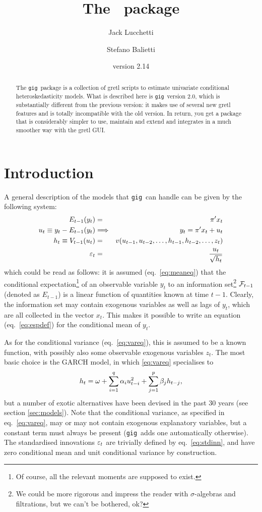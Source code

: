 \documentclass[a4paper,11pt]{article}
\title{The \gig\ package}
\author{Jack Lucchetti \and Stefano Balietti}
\date{version 2.14}
\newcommand{\app}[1]{\textsf{#1}}
\newcounter{script}[section]
\newcommand{\stdu}{\ensuremath \varepsilon}
\newcommand{\uhat}{\ensuremath u}
\newcommand{\InfSet}[1]{\ensuremath \mathcal{F}_{#1}}
\newcommand{\gig}{\texttt{gig}}
\begin{document}
\maketitle

\begin{abstract}
The \gig\ package is a collection of \app{gretl} scripts to estimate
univariate conditional heteroskedasticity models. What is described
here is \gig\ version 2.0, which is substantially different from the
previous version: it makes use of several new \app{gretl} features and
is totally incompatible with the old version. In return, you get a
package that is considerably simpler to use, maintain and extend and
integrates in a much smoother way with the \app{gretl} GUI.
\end{abstract}

\tableofcontents

\section{Introduction}

A general description of the models that \gig\ can handle can be given
by the following system:
\begin{eqnarray}
  \label{eq:meaneq}
  E_{t-1}(y_t) & = & \pi'x_t \\
  \label{eq:espdef}
  \uhat_{t} \equiv y_t - E_{t-1}(y_t) & \Longrightarrow &
  y_t = \pi'x_t + \uhat_{t} \\
  \label{eq:vareq}
  h_t \equiv V_{t-1}(\uhat_{t}) & = & 
  v(\uhat_{t-1}, \uhat_{t-2}, \ldots, 
  h_{t-1}, h_{t-2}, \ldots, z_t) \\
  \label{eq:stdinn}
  \stdu_t & = & \frac{\uhat_{t}}{\sqrt{h_t}}
\end{eqnarray}
which could be read as follows: it is assumed (eq.~\ref{eq:meaneq})
that the conditional expectation\footnote{Of course, all the relevant
  moments are supposed to exist.} of an observable variable $y_t$ to an
information set\footnote{We could be more rigorous and impress the
  reader with $\sigma$-algebras and filtrations, but we can't be
  bothered, ok?}  $\InfSet{t-1}$ (denoted as $E_{t-1}$) is a linear
function of quantities known at time $t-1$. Clearly, the information
set may contain exogenous variables as well as lags of $y_t$, which
are all collected in the vector $x_t$. This makes it possible to write
an equation (eq.~\ref{eq:espdef}) for the conditional mean of $y_t$.

As for the conditional variance (eq.~\ref{eq:vareq}), this is assumed
to be a known function, with possibly also some observable exogenous
variables $z_t$. The most basic choice is the GARCH model, in which
\eqref{eq:vareq} specialises to
\[
  h_t = \omega +  \sum_{i=1}^q \alpha_i \uhat_{t-i}^2 + 
  \sum_{j=1}^p\beta_j h_{t-j} ,
\]
but a number of exotic alternatives have been devised in the past 30
years (see section \ref{sec:models}). Note that the conditional
variance, as specified in eq.~\eqref{eq:vareq}, may or may not contain
exogenous explanatory variables, but a constant term must always be
present (\gig\ adds one automatically otherwise). The
standardised innovations $\stdu_t$ are trivially defined by
eq.~\eqref{eq:stdinn}, and have zero conditional mean and unit
conditional variance by construction.
\end{document}
